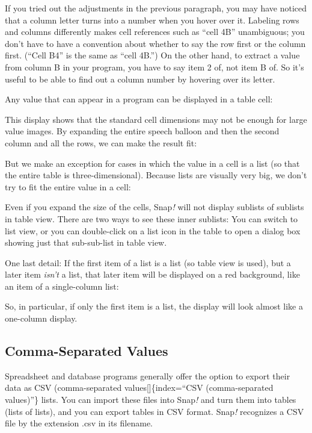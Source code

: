 \documentclass[
  letterpaper,
]{book}
\begin{document}
If you tried out the adjustments in the previous paragraph, you may have
noticed that a column letter turns into a number when you hover over it.
Labeling rows and columns differently makes cell references such as
``cell 4B'' unambiguous; you don't have to have a convention about
whether to say the row first or the column first. (``Cell B4'' is the
same as ``cell 4B.'') On the other hand, to extract a value from column
B in your program, you have to say item 2 of, not item B of. So it's
useful to be able to find out a column number by hovering over its
letter.

Any value that can appear in a program can be displayed in a table cell:

This display shows that the standard cell dimensions may not be enough
for large value images. By expanding the entire speech balloon and then
the second column and all the rows, we can make the result fit:

But we make an exception for cases in which the value in a cell is a
list (so that the entire table is three-dimensional). Because lists are
visually very big, we don't try to fit the entire value in a cell:

Even if you expand the size of the cells, Snap\emph{!} will not display
sublists of sublists in table view. There are two ways to see these
inner sublists: You can switch to list view, or you can double-click on
a list icon in the table to open a dialog box showing just that
sub-sub-list in table view.

One last detail: If the first item of a list is a list (so table view is
used), but a later item \emph{isn't} a list, that later item will be
displayed on a red background, like an item of a single-column list:

So, in particular, if only the first item is a list, the display will
look almost like a one-column display.

\subsection{Comma-Separated Values}\label{comma-separated-values}

Spreadsheet and database programs generally offer the option to export
their data as CSV (comma-separated values{[}{]}\{index=``CSV
(comma-separated values)''\} lists. You can import these files into
Snap\emph{!} and turn them into tables (lists of lists), and you can
export tables in CSV format. Snap\emph{!} recognizes a CSV file by the
extension .csv in its filename.
\end{document}
